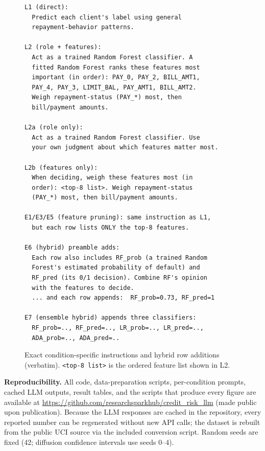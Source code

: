 \documentclass[conference]{IEEEtran}
\begin{document}
\begin{figure}[!t]
\scriptsize
\begin{verbatim}
L1 (direct):
  Predict each client's label using general
  repayment-behavior patterns.

L2 (role + features):
  Act as a trained Random Forest classifier. A
  fitted Random Forest ranks these features most
  important (in order): PAY_0, PAY_2, BILL_AMT1,
  PAY_4, PAY_3, LIMIT_BAL, PAY_AMT1, BILL_AMT2.
  Weigh repayment-status (PAY_*) most, then
  bill/payment amounts.

L2a (role only):
  Act as a trained Random Forest classifier. Use
  your own judgment about which features matter most.

L2b (features only):
  When deciding, weigh these features most (in
  order): <top-8 list>. Weigh repayment-status
  (PAY_*) most, then bill/payment amounts.

E1/E3/E5 (feature pruning): same instruction as L1,
  but each row lists ONLY the top-8 features.

E6 (hybrid) preamble adds:
  Each row also includes RF_prob (a trained Random
  Forest's estimated probability of default) and
  RF_pred (its 0/1 decision). Combine RF's opinion
  with the features to decide.
  ... and each row appends:  RF_prob=0.73, RF_pred=1

E7 (ensemble hybrid) appends three classifiers:
  RF_prob=.., RF_pred=.., LR_prob=.., LR_pred=..,
  ADA_prob=.., ADA_pred=..
\end{verbatim}
\caption{Exact condition-specific instructions and hybrid row additions (verbatim). \texttt{<top-8 list>} is the ordered feature list shown in L2.}
\label{fig:instr}
\end{figure}

\medskip
\noindent\textbf{Reproducibility.} All code, data-preparation scripts, per-condition prompts, cached LLM outputs, result tables, and the scripts that produce every figure are available at \url{https://github.com/researchsparkhub/credit_risk_llm} (made public upon publication). Because the LLM responses are cached in the repository, every reported number can be regenerated without new API calls; the dataset is rebuilt from the public UCI source via the included conversion script. Random seeds are fixed (42; diffusion confidence intervals use seeds 0--4).
\end{document}
